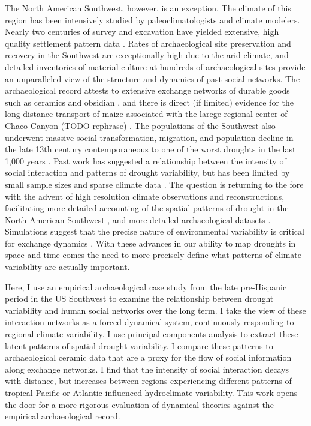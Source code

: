 \documentclass[11pt]{iopart}
\begin{document}
The North American Southwest, however, is an exception. The climate of this region has been intensively studied by paleoclimatologists and climate modelers. Nearly two centuries of survey and excavation have yielded extensive, high quality settlement pattern data \parencite{Hill2004}. Rates of archaeological site preservation and recovery in the Southwest are exceptionally high due to the arid climate, and detailed inventories of material culture at hundreds of archaeological sites provide an unparalleled view of the structure and dynamics of past social networks. The archaeological record attests to extensive exchange networks of durable goods such as ceramics and obsidian \parencite{Malville2001,Taliaferro2010,Mills2013a}, and there is direct (if limited) evidence for the long-distance transport of maize associated with the larege regional center of Chaco Canyon (TODO rephrase) \parencite{Benson2009,Benson2010}. The populations of the Southwest also underwent massive social transformation, migration, and population decline in the late 13th century contemporaneous to one of the worst droughts in the last 1,000 years \parencite{Hill2004}. Past work has suggested a relationship between the intensity of social interaction and patterns of drought variability, but has been limited by small sample sizes and sparse climate data \parencite{Rautman1993a,Johnson1990ChumashAnalysis,Cordell2007}. The question is returning to the fore with the advent of high resolution climate observations and reconstructions, facilitating more detailed accounting of the spatial patterns of drought in the North American Southwest \parencite{Strawhacker2017RiskProvince}, and more detailed archaeological datasets \parencite{Borck2015}. Simulations suggest that the precise nature of environmental variability is critical for exchange dynamics \parencite{Freeman2014}. With these advances in our ability to map droughts in space and time comes the need to more precisely define what patterns of climate variability are actually important.

Here, I use an empirical archaeological case study from the late pre-Hispanic period in the US Southwest to examine the relationship between drought variability and human social networks over the long term. I take the view of these interaction networks as a forced dynamical system, continuously responding to regional climate variability. I use principal components analysis to extract these latent patterns of spatial drought variability. I compare these patterns to archaeological ceramic data that are a proxy for the flow of social information along exchange networks. I find that the intensity of social interaction decays with distance, but increases between regions experiencing different patterns of tropical Pacific or Atlantic influenced hydroclimate variability. This work opens the door for a more rigorous evaluation of dynamical theories against the empirical archaeological record.
\end{document}
